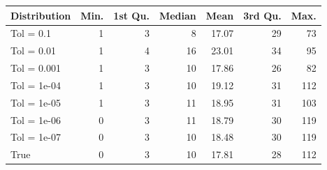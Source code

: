 \begin{figure} 
\begin{tabular}{lrrrrrr}
 Distribution & Min. & 1st Qu. & Median & Mean & 3rd Qu. & Max. \\ 
  \hline
\hline
Tol =  0.1 & 1 & 3 & 8 & 17.07 & 29 & 73 \\ 
  Tol =  0.01 & 1 & 4 & 16 & 23.01 & 34 & 95 \\ 
  Tol =  0.001 & 1 & 3 & 10 & 17.86 & 26 & 82 \\ 
  Tol =  1e-04 & 1 & 3 & 10 & 19.12 & 31 & 112 \\ 
  Tol =  1e-05 & 1 & 3 & 11 & 18.95 & 31 & 103 \\ 
  Tol =  1e-06 & 0 & 3 & 11 & 18.79 & 30 & 119 \\ 
  Tol =  1e-07 & 0 & 3 & 10 & 18.48 & 30 & 119 \\ 
  True & 0 & 3 & 10 & 17.81 & 28 & 112 \\ 
  \end{tabular}
\label{tab:SummaryTable}
\end{figure} 
